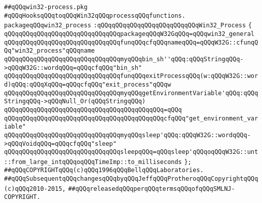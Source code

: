 \label{src/lib/std/src/win32/win32-process.pkg}
\verb|##qQQqwin32-process.pkg|\newline
\newline
\newline
\newline
\verb|#qQQqHooksqQQqtoqQQqWin32qQQqprocessqQQqfunctions.|\newline
\newline
\newline
\newline
\verb|packageqQQqwin32_process|\newline
\verb|:qQQqqQQqqQQqqQQqqQQqqQQqqQQqWin32_Process|\newline
\verb|{|\newline
\newline
\verb|qQQqqQQqqQQqqQQqqQQqqQQqqQQqqQQqpackageqQQqW32GqQQq=qQQqwin32_general|\newline
\newline
\verb|qQQqqQQqqQQqqQQqqQQqqQQqqQQqqQQqfunqQQqcfqQQqnameqQQq=qQQqW32G::cfunqQQq"win32_process"qQQqname|\newline
\newline
\verb|qQQqqQQqqQQqqQQqqQQqqQQqqQQqqQQqmyqQQqbin_sh''qQQq:qQQqStringqQQq->qQQqW32G::wordqQQq=qQQqcfqQQq"bin_sh"|\newline
\newline
\verb|qQQqqQQqqQQqqQQqqQQqqQQqqQQqqQQqfunqQQqexitProcessqQQq(w:qQQqW32G::word)qQQq:qQQqXqQQq=qQQqcfqQQq"exit_process"qQQqw|\newline
\newline
\verb|qQQqqQQqqQQqqQQqqQQqqQQqqQQqqQQqmyqQQqgetEnvironmentVariable'qQQq:qQQqStringqQQq->qQQqNull_Or(qQQqStringqQQq)|\newline
\verb|qQQqqQQqqQQqqQQqqQQqqQQqqQQqqQQqqQQqqQQqqQQq=qQQq|\newline
\verb|qQQqqQQqqQQqqQQqqQQqqQQqqQQqqQQqqQQqqQQqqQQqcfqQQq"get_environment_variable"|\newline
\newline
\verb|qQQqqQQqqQQqqQQqqQQqqQQqqQQqqQQqmyqQQqsleep'qQQq:qQQqW32G::wordqQQq->qQQqVoidqQQq=qQQqcfqQQq"sleep"|\newline
\newline
\verb|qQQqqQQqqQQqqQQqqQQqqQQqqQQqqQQqsleepqQQq=qQQqsleep'qQQqoqQQqW32G::unt::from_large_intqQQqoqQQqTimeImp::to_milliseconds|\newline
\verb|};|\newline
\newline
\newline
\verb|##qQQqCOPYRIGHTqQQq(c)qQQq1996qQQqBellqQQqLaboratories.|\newline
\verb|##qQQqSubsequentqQQqchangesqQQqbyqQQqJeffqQQqProtheroqQQqCopyrightqQQq(c)qQQq2010-2015,|\newline
\verb|##qQQqreleasedqQQqperqQQqtermsqQQqofqQQqSMLNJ-COPYRIGHT.|\newline

